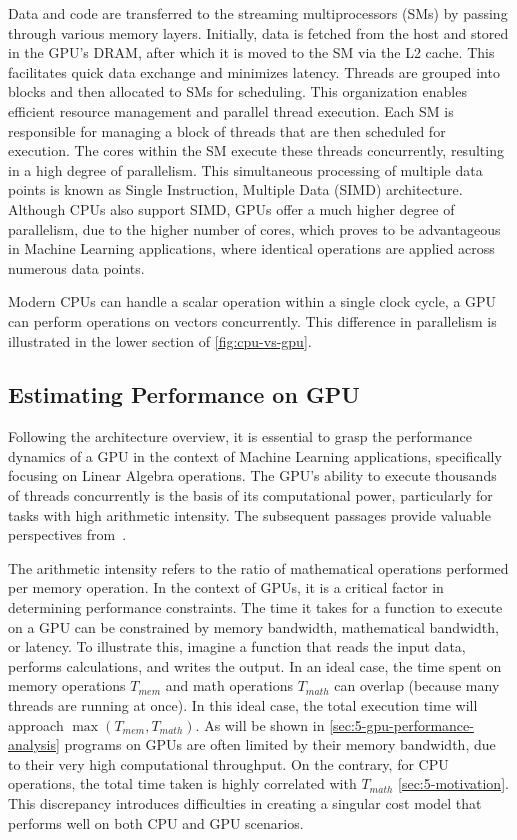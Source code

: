 Data and code are transferred to the streaming multiprocessors (SMs) by passing through various memory layers. Initially, data is fetched from the host and stored in the GPU's DRAM, after which it is moved to the SM via the L2 cache. This facilitates quick data exchange and minimizes latency. Threads are grouped into blocks and then allocated to SMs for scheduling. This organization enables efficient resource management and parallel thread execution. Each SM is responsible for managing a block of threads that are then scheduled for execution. The cores within the SM execute these threads concurrently, resulting in a high degree of parallelism. This simultaneous processing of multiple data points is known as Single Instruction, Multiple Data (SIMD) architecture. Although CPUs also support SIMD, GPUs offer a much higher degree of parallelism, due to the higher number of cores, which proves to be advantageous in Machine Learning applications, where identical operations are applied across numerous data points.

Modern CPUs can handle a scalar operation within a single clock cycle, a GPU can perform operations on vectors concurrently. This difference in parallelism is illustrated in the lower section of \autoref{fig:cpu-vs-gpu}.

\subsection{Estimating Performance on GPU}
\label{subsec:gpu-performance}
Following the architecture overview, it is essential to grasp the performance dynamics of a GPU in the context of Machine Learning applications, specifically focusing on Linear Algebra operations. The GPU's ability to execute thousands of threads concurrently is the basis of its computational power, particularly for tasks with high arithmetic intensity. The subsequent passages provide valuable perspectives from~\cite{nvidia-gpu-performance:online}.

The arithmetic intensity refers to the ratio of mathematical operations performed per memory operation. In the context of GPUs, it is a critical factor in determining performance constraints. The time it takes for a function to execute on a GPU can be constrained by memory bandwidth, mathematical bandwidth, or latency. To illustrate this, imagine a function that reads the input data, performs calculations, and writes the output. In an ideal case, the time spent on memory operations $ T_{mem} $ and math operations $ T_{math} $ can overlap (because many threads are running at once). In this ideal case, the total execution time will approach $ \max(T_{mem}, T_{math})$. As will be shown in \autoref{sec:5-gpu-performance-analysis} programs on GPUs are often limited by their memory bandwidth, due to their very high computational throughput. On the contrary, for CPU operations, the total time taken is highly correlated with $T_{math}$ \autoref{sec:5-motivation}. This discrepancy introduces difficulties in creating a singular cost model that performs well on both CPU and GPU scenarios.

